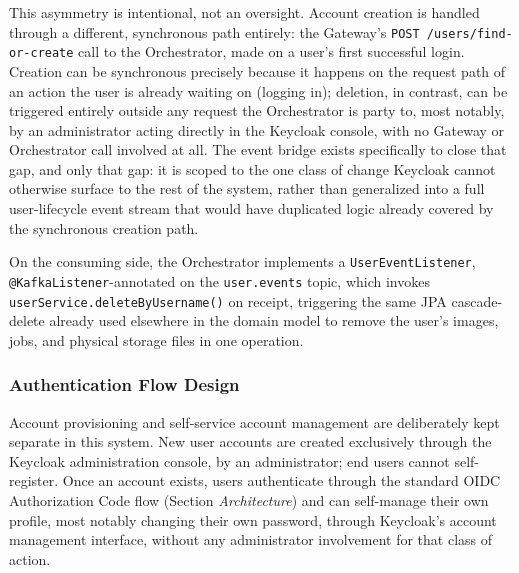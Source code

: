 \documentclass[twoside]{supsistudent}
\begin{document}
This asymmetry is intentional, not an oversight. Account creation is handled through a different, synchronous path entirely: the Gateway's \texttt{POST /users/find-or-create} call to the Orchestrator, made on a user's first successful login. Creation can be synchronous precisely because it happens on the request path of an action the user is already waiting on (logging in); deletion, in contrast, can be triggered entirely outside any request the Orchestrator is party to, most notably, by an administrator acting directly in the Keycloak console, with no Gateway or Orchestrator call involved at all. The event bridge exists specifically to close that gap, and only that gap: it is scoped to the one class of change Keycloak cannot otherwise surface to the rest of the system, rather than generalized into a full user-lifecycle event stream that would have duplicated logic already covered by the synchronous creation path.

On the consuming side, the Orchestrator implements a \texttt{UserEventListener}, \texttt{@KafkaListener}-annotated on the \texttt{user.events} topic, which invokes \texttt{userService.deleteByUsername()} on receipt, triggering the same JPA cascade-delete already used elsewhere in the domain model to remove the user's images, jobs, and physical storage files in one operation.

\subsubsection{Authentication Flow Design}
Account provisioning and self-service account management are deliberately kept separate in this system. New user accounts are created exclusively through the Keycloak administration console, by an administrator; end users cannot self-register. Once an account exists, users authenticate through the standard OIDC Authorization Code flow (Section \emph{Architecture}) and can self-manage their own profile, most notably changing their own password, through Keycloak's account management interface, without any administrator involvement for that class of action.
\end{document}
